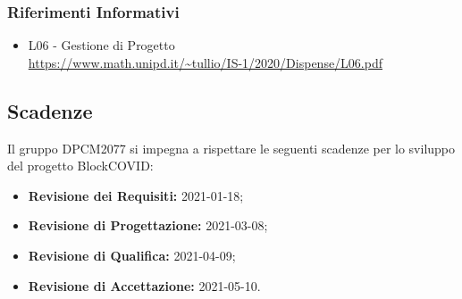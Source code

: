 \subsubsection{Riferimenti Informativi}
\begin{itemize}
	\item {L06 - Gestione di Progetto} \\
 \url{https://www.math.unipd.it/~tullio/IS-1/2020/Dispense/L06.pdf}
\end{itemize}

\subsection{Scadenze}
Il gruppo DPCM2077 si impegna a rispettare le seguenti scadenze per lo sviluppo del progetto BlockCOVID:
\begin{itemize}
	\item \textbf{Revisione dei Requisiti:} 2021-01-18; \\
	\item \textbf{Revisione di Progettazione:} 2021-03-08; \\
	\item \textbf{Revisione di Qualifica:} 2021-04-09; \\
	\item \textbf{Revisione di Accettazione:} 2021-05-10. \\
\end{itemize}




